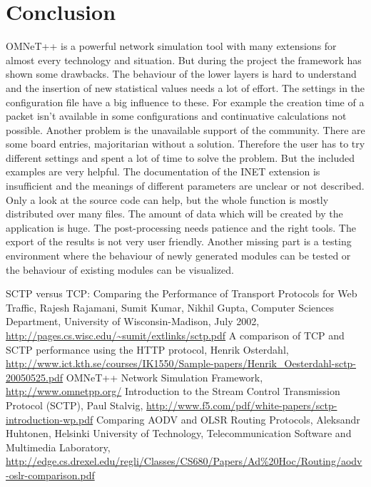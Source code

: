 \documentclass[a4paper]{article}
\begin{document}
\section{Conclusion}
OMNeT++ is a powerful network simulation tool with many extensions for almost every technology and situation. But during the project the framework has shown some drawbacks. The behaviour of the lower layers is hard to understand and the insertion of new statistical values needs a lot of effort. The settings in the configuration file have a big influence to these. For example the creation time of a packet isn't available in some configurations and continuative calculations not possible.
Another problem is the unavailable support of the community. There are some board entries, majoritarian without a solution. Therefore the user has to try different settings and spent a lot of time to solve the problem. But the included examples are very helpful.
The documentation of the INET extension is insufficient and the meanings of different parameters are unclear or not described. Only a look at the source code can help, but the whole function is mostly distributed over many files.
The amount of data which will be created by the application is huge. The post-processing needs patience and the right tools. The export of the results is not very user friendly.
Another missing part is a testing environment where the behaviour of newly generated modules can be tested or the behaviour of existing modules can be visualized.


\begin{thebibliography}{99}
 SCTP versus TCP: Comparing the Performance of Transport Protocols for Web Traffic, Rajesh Rajamani, Sumit Kumar, Nikhil Gupta, Computer Sciences Department, University of Wisconsin-Madison, July 2002, \url{http://pages.cs.wisc.edu/~sumit/extlinks/sctp.pdf}
 A comparison of TCP and SCTP performance using the HTTP protocol, Henrik Osterdahl, \url{http://www.ict.kth.se/courses/IK1550/Sample-papers/Henrik_Oesterdahl-sctp-20050525.pdf}
 OMNeT++ Network Simulation Framework, \url{http://www.omnetpp.org/}
 Introduction to the Stream Control Transmission Protocol (SCTP), Paul Stalvig, \url{http://www.f5.com/pdf/white-papers/sctp-introduction-wp.pdf}
 Comparing AODV and OLSR Routing Protocols, Aleksandr Huhtonen, Helsinki University of Technology, Telecommunication Software and Multimedia Laboratory, \url{http://edge.cs.drexel.edu/regli/Classes/CS680/Papers/Ad%20Hoc/Routing/aodv-oslr-comparison.pdf}
\end{thebibliography}
\end{document}
